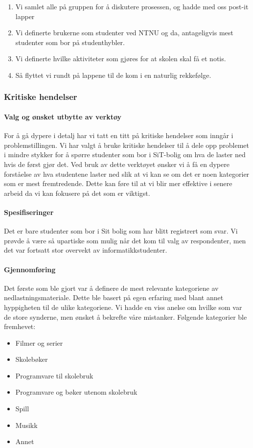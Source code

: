 \begin{enumerate}
    \item Vi samlet alle på gruppen for å diskutere prosessen, og hadde med oss post-it lapper
    \item Vi definerte brukerne som studenter ved NTNU og da, antageligvis mest studenter som bor på studenthybler.
    \item Vi definerte hvilke aktiviteter som gjøres for at skolen skal få et notis.
    \item Så flyttet vi rundt på lappene til de kom i en naturlig rekkefølge.
\end{enumerate}

\subsubsection{Kritiske hendelser}

\paragraph{Valg og ønsket utbytte av verktøy}
For å gå dypere i detalj har vi tatt en titt på kritiske hendelser som inngår i problemstillingen. Vi har valgt å bruke kritiske hendelser til å dele opp problemet i mindre stykker for å spørre studenter som bor i SiT-bolig om hva de laster ned hvis de først gjør det. Ved bruk av dette verktøyet ønsker vi å få en dypere forståelse av hva studentene laster ned slik at vi kan se om det er noen kategorier som er mest fremtredende. Dette kan føre til at vi blir mer effektive i senere arbeid da vi kan fokusere på det som er viktigst.

\paragraph{Spesifiseringer}
Det er bare studenter som bor i Sit bolig som har blitt registrert som svar. Vi prøvde å være så upartiske som mulig når det kom til valg av respondenter, men det var fortsatt stor overvekt av informatikkstudenter.

\paragraph{Gjennomføring}
Det første som ble gjort var å definere de mest relevante kategoriene av nedlastningsmateriale. Dette ble basert på egen erfaring med blant annet hyppigheten til de ulike kategoriene. Vi hadde en viss anelse om hvilke som var de store synderne, men ønsket å bekrefte våre mistanker. Følgende kategorier ble fremhevet: 
\begin{itemize}
    \item Filmer og serier
    \item Skolebøker
    \item Programvare til skolebruk
    \item Programvare og bøker utenom skolebruk
    \item Spill
    \item Musikk
    \item Annet
\end{itemize}

